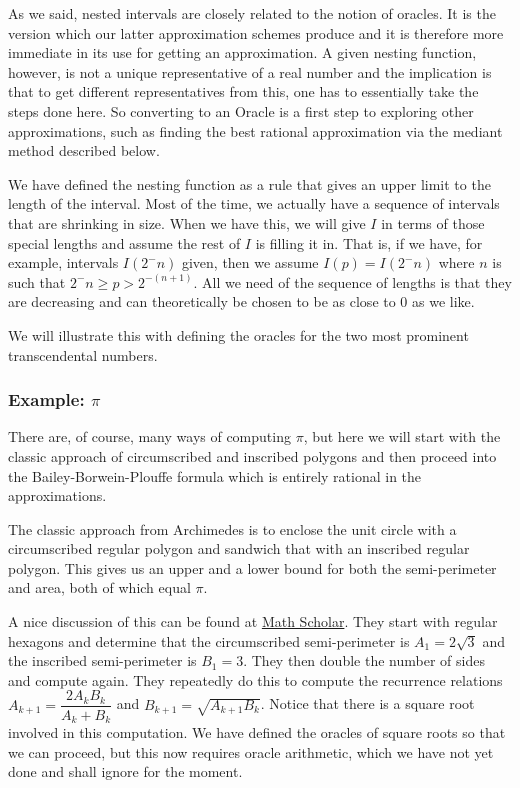\documentclass[12pt]{article}
\theoremstyle{remark}
\begin{document}
As we said, nested intervals are closely related to the notion of oracles. It is the version which our latter approximation schemes produce and it is therefore more immediate in its use for getting an approximation. A given nesting function, however, is not a unique representative of a real number and the implication is that to get different representatives from this, one has to essentially take the steps done here. So converting to an Oracle is a first step to exploring other approximations, such as finding the best rational approximation via the mediant method described below. 

We have defined the nesting function as a rule that gives an upper limit to the length of the interval. Most of the time, we actually have a sequence of intervals that are shrinking in size. When we have this, we will give $I$ in terms of those special lengths and assume the rest of $I$ is filling it in. That is, if we have, for example, intervals $I(2^-n)$ given, then we assume $I(p) = I(2^-n)$ where $n$ is such that $2^-n \geq p > 2^{-(n+1)}$. All we need of the sequence of lengths is that they are decreasing and can theoretically be chosen to be as close to 0 as we like. 

We will illustrate this with defining the oracles for the two most prominent transcendental numbers. 


\subsubsection{Example: $\pi$}

There are, of course, many ways of computing $\pi$, but here we will start with the classic approach of circumscribed and inscribed polygons and then proceed into the Bailey-Borwein-Plouffe formula which is entirely rational in the approximations. 

The classic approach from Archimedes is to enclose the unit circle with a circumscribed regular polygon and sandwich that with an inscribed regular polygon. This gives us an upper and a lower bound for both the semi-perimeter and area, both of which equal $\pi$. 

A nice discussion of this can be found at \href{https://mathscholar.org/2019/02/simple-proofs-archimedes-calculation-of-pi/}{Math Scholar}. They start with regular hexagons and determine that the circumscribed semi-perimeter is $A_1 = 2 \sqrt{3}$ and the inscribed semi-perimeter is $B_1 = 3$. They then double the number of sides and compute again. They repeatedly do this to compute the recurrence relations $A_{k+1} = \dfrac{2A_k B_k}{A_k + B_k}$ and $B_{k+1} = \sqrt{A_{k+1}B_k}$. Notice that there is a square root involved in this computation. We have defined the oracles of square roots so that we can proceed, but this now requires oracle arithmetic, which we have not yet done and shall ignore for the moment.  
\end{document}
